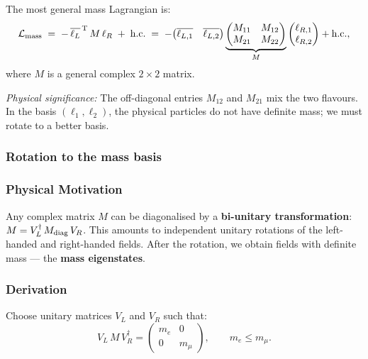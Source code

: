 \documentclass[../main.tex]{subfiles}
\begin{document}
The most general mass Lagrangian is:
\begin{equation}
  \mathcal{L}_{\rm mass}
  \;=\;
  -\,\overline{\ell_L}^{\,\rm T}\,M\,\ell_R \;+\; \text{h.c.}
  \;=\;
  -\!
  \begin{pmatrix}\overline{\ell_{L,1}} & \overline{\ell_{L,2}}\end{pmatrix}
  \underbrace{\begin{pmatrix}M_{11} & M_{12} \\ M_{21} & M_{22}\end{pmatrix}}_{M}
  \begin{pmatrix}\ell_{R,1}\\\ell_{R,2}\end{pmatrix}
  +\text{h.c.},
  \label{eq:lec11:mass-matrix}
\end{equation}
where $M$ is a general complex $2\times2$ matrix.

\textit{Physical significance:} The off-diagonal entries $M_{12}$ and $M_{21}$ mix the two flavours.  In the basis $(\ell_1,\ell_2)$, the physical particles do not have definite mass; we must rotate to a better basis.

\subsubsection*{Rotation to the mass basis}

\subsubsection*{Physical Motivation}

Any complex matrix $M$ can be diagonalised by a \textbf{bi-unitary transformation}: $M = V_L^\dagger\,M_{\rm diag}\,V_R$.  This amounts to independent unitary rotations of the left-handed and right-handed fields.  After the rotation, we obtain fields with definite mass — the \textbf{mass eigenstates}.

\subsubsection*{Derivation}

Choose unitary matrices $V_L$ and $V_R$ such that:
\begin{equation}
  \boxed{
  V_L\,M\,V_R^\dagger
  =
  \begin{pmatrix}m_e & 0 \\ 0 & m_\mu\end{pmatrix},
  \qquad m_e \leq m_\mu.}
  \label{eq:lec11:diagonalisation}
\end{equation}
\end{document}
